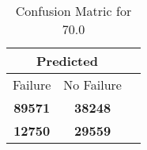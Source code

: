 \begin{table}[] 
\caption{Confusion Matric for 70.0} 
\label{Table: Prediction Accuracy-DMD70.0OnlySunEKF-resetReflection-Reflection} 
\centering 
\begin{tabular} 
 {@{}ccc@{}} 
\toprule 
\multicolumn{2}{c}{\textbf{Predicted}}
 \\ \midrule 
\multicolumn{1}{|c|}{Failure} & 
\multicolumn{1}{c|}{No Failure}
 \\ \midrule 
\multicolumn{1}{|c|}{\color{green}\textbf{89571}} & 
\multicolumn{1}{c|}{\color{green}\textbf{38248}}
 \\ \midrule 
\multicolumn{1}{|c|}{\color{red}\textbf{12750}} & 
\multicolumn{1}{c|}{\color{red}\textbf{29559}}
 \\ \bottomrule 
\end{tabular} 
\end{table} 
